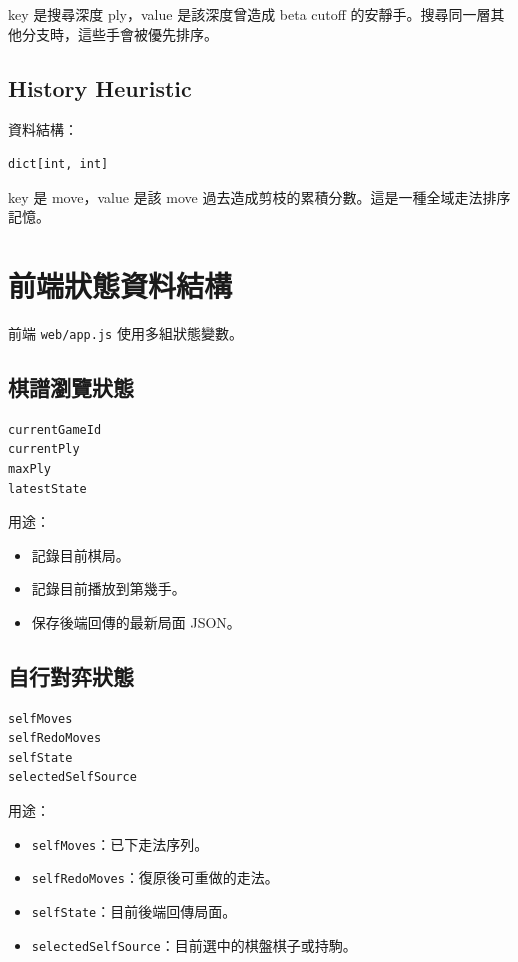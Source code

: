 \documentclass[12pt,a4paper,fontset=none]{ctexart}
\begin{document}
key 是搜尋深度 ply，value 是該深度曾造成 beta cutoff 的安靜手。搜尋同一層其他分支時，這些手會被優先排序。

\subsection{History Heuristic}

資料結構：

\begin{lstlisting}[style=cmd]
dict[int, int]
\end{lstlisting}

key 是 move，value 是該 move 過去造成剪枝的累積分數。這是一種全域走法排序記憶。

\section{前端狀態資料結構}

前端 \texttt{web/app.js} 使用多組狀態變數。

\subsection{棋譜瀏覽狀態}

\begin{lstlisting}[style=cmd]
currentGameId
currentPly
maxPly
latestState
\end{lstlisting}

用途：

\begin{itemize}
  \item 記錄目前棋局。
  \item 記錄目前播放到第幾手。
  \item 保存後端回傳的最新局面 JSON。
\end{itemize}

\subsection{自行對弈狀態}

\begin{lstlisting}[style=cmd]
selfMoves
selfRedoMoves
selfState
selectedSelfSource
\end{lstlisting}

用途：

\begin{itemize}
  \item \texttt{selfMoves}：已下走法序列。
  \item \texttt{selfRedoMoves}：復原後可重做的走法。
  \item \texttt{selfState}：目前後端回傳局面。
  \item \texttt{selectedSelfSource}：目前選中的棋盤棋子或持駒。
\end{itemize}
\end{document}
